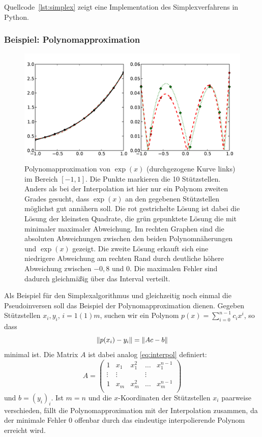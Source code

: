 Quellcode~\ref{lst:simplex} zeigt eine Implementation des
Simplexverfahrens in Python.

\subsubsection{Beispiel: Polynomapproximation}

\begin{figure}[t]
  \centering
  \includegraphics[width=\textwidth]{plots/qr_simplex_example}
  \caption{Polynomapproximation von $\exp(x)$ (durchgezogene Kurve
    links) im Bereich $[-1,1]$. Die Punkte markieren die 10
    Stützstellen. Anders als bei der Interpolation ist hier nur ein
    Polynom zweiten Grades gesucht, dass $\exp(x)$ an den gegebenen
    Stützstellen möglichst gut annähern soll. Die rot gestrichelte
    Lösung ist dabei die Lösung der kleinsten Quadrate, die grün
    gepunktete Lösung die mit minimaler maximaler Abweichung. Im
    rechten Graphen sind die absoluten Abweichungen zwischen den
    beiden Polynomnäherungen und $\exp(x)$ gezeigt. Die zweite Lösung
    erkauft sich eine niedrigere Abweichung am rechten Rand durch
    deutliche höhere Abweichung zwischen $-0,8$ und $0$. Die maximalen
    Fehler sind dadurch gleichmäßig über das Interval verteilt.}
  \label{fig:polyapprox}
\end{figure}

Als Beispiel für den Simplexalgorithmus und gleichzeitig noch einmal
die Pseudoinversen soll das Beispiel der Polynomapproximation
dienen. Gegeben Stützstellen $x_i, y_i$, $i=1(1)m$, suchen wir ein
Polynom $p(x)=\sum_{i=0}^{n-1} c_ix^i$, so dass
\begin{equation}
  \left\lVert{p(x_i) - y_i}\right\rVert = \left\lVert{A c - b}\right\rVert
\end{equation}
minimal ist. Die Matrix $A$ ist dabei analog \eqref{eq:interpol} definiert:
\begin{equation}
  A=
  \begin{pmatrix}
    1 & x_1 & x_1^2 & \ldots & x_1^{n-1}\\
    \vdots & \vdots & & \vdots \\
    1 & x_m & x_m^2 & \ldots & x_m^{n-1}\\
  \end{pmatrix}
\end{equation}
und $b=(y_i)_i$. Ist $m=n$ und die $x$-Koordinaten der Stützstellen
$x_i$ paarweise verschieden, fällt die Polynomapproximation mit der
Interpolation zusammen, da der minimale Fehler $0$ offenbar durch das
eindeutige interpolierende Polynom erreicht wird.

